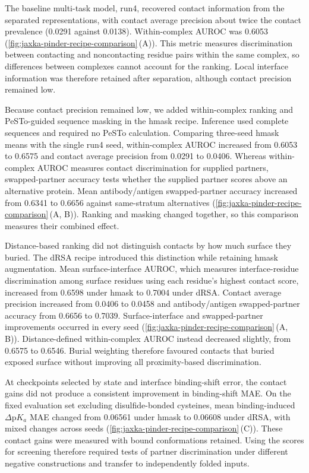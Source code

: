 The baseline multi-task model, run4, recovered contact information from the separated representations, with contact average precision about twice the contact prevalence (0.0291 against 0.0138). Within-complex AUROC was 0.6053 (\cref{fig:jaxka-pinder-recipe-comparison}\,(A)). This metric measures discrimination between contacting and noncontacting residue pairs within the same complex, so differences between complexes cannot account for the ranking. Local interface information was therefore retained after separation, although contact precision remained low.

Because contact precision remained low, we added within-complex ranking and PeSTo-guided sequence masking in the hmask recipe. Inference used complete sequences and required no PeSTo calculation. Comparing three-seed hmask means with the single run4 seed, within-complex AUROC increased from 0.6053 to 0.6575 and contact average precision from 0.0291 to 0.0406. Whereas within-complex AUROC measures contact discrimination for supplied partners, swapped-partner accuracy tests whether the supplied partner scores above an alternative protein. Mean antibody/antigen swapped-partner accuracy increased from 0.6341 to 0.6656 against same-stratum alternatives (\cref{fig:jaxka-pinder-recipe-comparison}\,(A, B)). Ranking and masking changed together, so this comparison measures their combined effect.

Distance-based ranking did not distinguish contacts by how much surface they buried. The dRSA recipe introduced this distinction while retaining hmask augmentation. Mean surface-interface AUROC, which measures interface-residue discrimination among surface residues using each residue's highest contact score, increased from 0.6598 under hmask to 0.7004 under dRSA. Contact average precision increased from 0.0406 to 0.0458 and antibody/antigen swapped-partner accuracy from 0.6656 to 0.7039. Surface-interface and swapped-partner improvements occurred in every seed (\cref{fig:jaxka-pinder-recipe-comparison}\,(A, B)). Distance-defined within-complex AUROC instead decreased slightly, from 0.6575 to 0.6546. Burial weighting therefore favoured contacts that buried exposed surface without improving all proximity-based discrimination.

At checkpoints selected by state and interface binding-shift error, the contact gains did not produce a consistent improvement in binding-shift MAE. On the fixed evaluation set excluding disulfide-bonded cysteines, mean binding-induced $\Delta\mathrm{p}K_a$ MAE changed from 0.06561 under hmask to 0.06608 under dRSA, with mixed changes across seeds (\cref{fig:jaxka-pinder-recipe-comparison}\,(C)). These contact gains were measured with bound conformations retained. Using the scores for screening therefore required tests of partner discrimination under different negative constructions and transfer to independently folded inputs.

